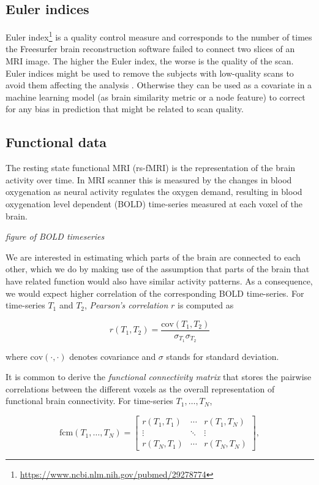 \subsection{Euler indices}
Euler index\footnote{\url{https://www.ncbi.nlm.nih.gov/pubmed/29278774}} is a quality control measure and corresponds to the number of times the Freesurfer brain reconstruction software failed to connect two slices of an MRI image. The higher the Euler index, the worse is the quality of the scan. Euler indices might be used to remove the subjects with low-quality scans to avoid them affecting the analysis \cite{kaufmann2019}. Otherwise they can be used as a covariate in a machine learning model (as brain similarity metric or a node feature) to correct for any bias in prediction that might be related to scan quality.

\subsection{Functional data}
The resting state functional MRI (rs-fMRI) is the representation of the brain activity over time. In MRI scanner this is measured by the changes in blood oxygenation as neural activity regulates the oxygen demand, resulting in blood oxygenation level dependent (BOLD) time-series measured at each voxel of the brain.

\textit{figure of BOLD timeseries}

We are interested in estimating which parts of the brain are connected to each other, which we do by making use of the assumption that parts of the brain that have related function would also have similar activity patterns. As a consequence, we would expect higher correlation of the corresponding BOLD time-series. For time-series $T_1$ and $T_2$, \textit{Pearson's correlation} $r$ is computed as

\begin{equation}
    r(T_1, T_2) = \frac{\mathrm{cov}(T_1, T_2)}{\sigma_{T_1} \sigma_{T_2}}
\end{equation}

where $\mathrm{cov}(\cdot, \cdot)$ denotes covariance and $\sigma$ stands for standard deviation.

It is common to derive the \textit{functional connectivity matrix} that stores the pairwise correlations between the different voxels as the overall representation of functional brain connectivity. For time-series $T_1, \dots, T_N$,

\begin{equation}
    \mathrm{fcm}(T_1, \dots, T_N) = \begin{bmatrix}
        r(T_1, T_1) & \cdots & r(T_1, T_N) \\
        \vdots & \ddots & \vdots \\
        r(T_N, T_1) & \cdots & r(T_N, T_N)
    \end{bmatrix},
\end{equation}

